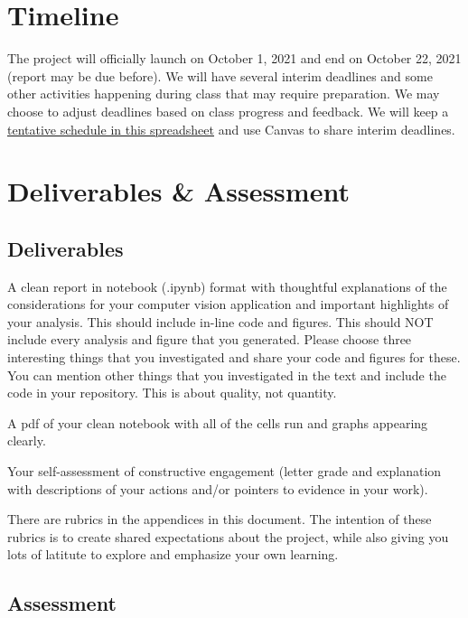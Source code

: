 \documentclass{tufte-handout}
\begin{document}
\section{Timeline}

The project will officially launch on October 1, 2021 and end on October 22, 2021 (report may be due before). We will have several interim deadlines and some other activities happening during class that may require preparation. We may choose to adjust deadlines based on class progress and feedback. We will keep a \href{https://docs.google.com/spreadsheets/d/1TyzKsfdCvZEzfaYswfJSHiYH2JU73gd0KCIOwQijvFo/edit\#gid=952438279}{ tentative schedule in this spreadsheet} and use Canvas to share interim deadlines.


\section{Deliverables \& Assessment}

\subsection{Deliverables}
\be
\item A clean report in notebook (.ipynb) format with thoughtful explanations of the considerations for your computer vision application and important highlights of your analysis. This should include in-line code and figures.
This should NOT include every analysis and figure that you generated. Please choose three interesting things that you investigated and share your code and figures for these. You can mention other things that you investigated in the text and include the code in your repository. This is about quality, not quantity.

\item A pdf of your clean notebook with all of the cells run and graphs appearing clearly.

\item Your self-assessment of constructive engagement (letter grade and explanation with descriptions of your actions and/or pointers to evidence in your work). 
\ee

There are rubrics in the appendices in this document. The intention of these rubrics is to create shared expectations about the project, while also giving you lots of latitute to explore and emphasize your own learning.\\

\subsection{Assessment}
\end{document}
